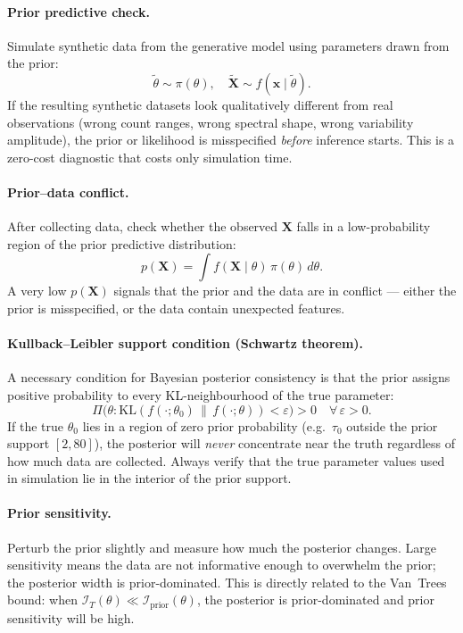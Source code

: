 \documentclass[11pt, a4paper]{article}
\begin{document}
\paragraph{Prior predictive check.}
Simulate synthetic data from the generative model using parameters drawn from
the prior:
\begin{equation}
    \tilde\theta \sim \pi(\theta), \quad
    \tilde{\mathbf{X}} \sim f(\mathbf{x}\mid\tilde\theta).
\end{equation}
If the resulting synthetic datasets look qualitatively different from real
observations (wrong count ranges, wrong spectral shape, wrong variability
amplitude), the prior or likelihood is misspecified \emph{before} inference
starts.
This is a zero-cost diagnostic that costs only simulation time.

\paragraph{Prior--data conflict.}
After collecting data, check whether the observed $\mathbf{X}$ falls in a
low-probability region of the prior predictive distribution:
\begin{equation}
    p(\mathbf{X}) = \int f(\mathbf{X}\mid\theta)\,\pi(\theta)\,d\theta.
\end{equation}
A very low $p(\mathbf{X})$ signals that the prior and the data are in conflict
--- either the prior is misspecified, or the data contain unexpected features.

\paragraph{Kullback--Leibler support condition (Schwartz theorem).}
A necessary condition for Bayesian posterior consistency is that the prior
assigns positive probability to every KL-neighbourhood of the true parameter:
\begin{equation}
    \Pi\bigl(\theta : \mathrm{KL}(f(\cdot;\theta_0)\,\|\,f(\cdot;\theta)) < \varepsilon\bigr) > 0
    \quad \forall\,\varepsilon > 0.
\end{equation}
If the true $\theta_0$ lies in a region of zero prior probability (e.g.\ $\tau_0$
outside the prior support $[2,80]$), the posterior will \emph{never} concentrate
near the truth regardless of how much data are collected.
Always verify that the true parameter values used in simulation lie in the
interior of the prior support.

\paragraph{Prior sensitivity.}
Perturb the prior slightly and measure how much the posterior changes.
Large sensitivity means the data are not informative enough to overwhelm the
prior; the posterior width is prior-dominated.
This is directly related to the Van~Trees bound: when
$\mathcal{I}_T(\theta) \ll \mathcal{I}_\mathrm{prior}(\theta)$, the posterior is
prior-dominated and prior sensitivity will be high.
\end{document}
